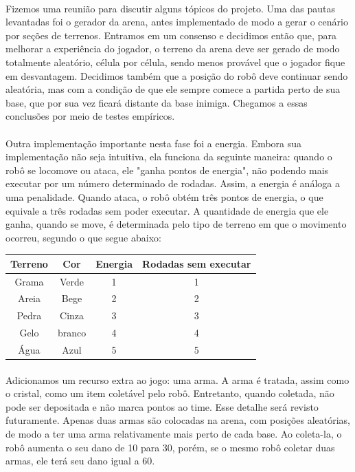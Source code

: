 \documentclass[a4paper]{article}
\begin{document}
  \paragraph{}
  Fizemos uma reunião para discutir alguns tópicos do projeto. Uma das pautas levantadas foi o gerador da arena, antes implementado de modo a gerar o cenário por seções de terrenos. Entramos em um consenso e decidimos então que, para melhorar a experiência do jogador, o terreno da arena deve ser gerado de modo totalmente aleatório, célula por célula, sendo menos provável que o jogador fique em desvantagem. Decidimos também que a posição do robô deve continuar sendo aleatória, mas com a condição de que ele sempre comece a partida perto de sua base, que por sua vez ficará distante da base inimiga. Chegamos a essas conclusões por meio de testes empíricos.
  \paragraph{}
  Outra implementação importante nesta fase foi a energia. Embora sua implementação não seja intuitiva, ela funciona da seguinte maneira: quando o robô se locomove ou ataca, ele "ganha pontos de energia", não podendo mais executar por um número determinado de rodadas. Assim, a energia é análoga a uma penalidade. Quando ataca, o robô obtém três pontos de energia, o que equivale a três rodadas sem poder executar. A quantidade de energia que ele ganha, quando se move, é determinada pelo tipo de terreno em que o movimento ocorreu, segundo o que segue abaixo:
  
  \begin{center}
  \begin{tabular}{|| c c c c||}
  \hline
  Terreno & Cor & Energia & Rodadas sem executar \\ [0.5ex]
  \hline \hline
  Grama & Verde & 1 & 1 \\
  \hline
  Areia & Bege & 2 & 2 \\
  \hline
  Pedra & Cinza & 3 & 3 \\
  \hline
  Gelo & branco & 4 & 4 \\
  \hline
  Água & Azul & 5 & 5 \\ [1ex]
  \hline
  \end{tabular}
  \end{center}
  
  \paragraph{}
  Adicionamos um recurso extra ao jogo: uma arma. A arma é tratada, assim como o cristal, como um item coletável pelo robô. Entretanto, quando coletada, não pode ser depositada e não marca pontos ao time. Esse detalhe será revisto futuramente. Apenas duas armas são colocadas na arena, com posições aleatórias, de modo a ter uma arma relativamente mais perto de cada base. Ao coleta-la, o robô aumenta o seu dano de 10 para 30, porém, se o mesmo robô coletar duas armas, ele terá seu dano igual a 60.
\end{document}
